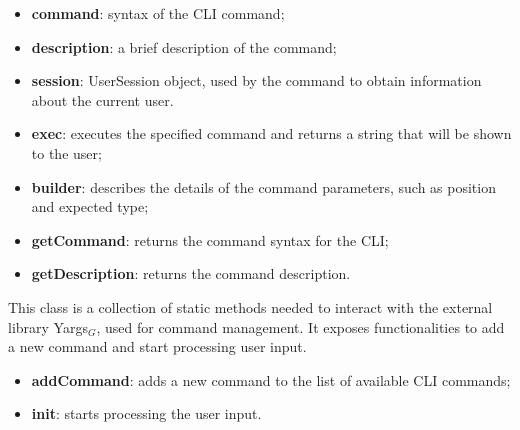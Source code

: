 					\begin{itemize}
						\item \textbf{command}: syntax of the CLI command;
						\item \textbf{description}: a brief description of the command;
						\item \textbf{session}: UserSession object, used by the command to obtain information about the current user.
					\end{itemize}

					\begin{itemize}
						\item \textbf{exec}: executes the specified command and returns a string that will be shown to the user;
						\item \textbf{builder}: describes the details of the command parameters, such as position and expected type;
						\item \textbf{getCommand}: returns the command syntax for the CLI;
						\item \textbf{getDescription}: returns the command description.
					\end{itemize}

			This class is a collection of static methods needed to interact with the external library Yargs$_{G}$, used for command management. It exposes functionalities to add a new command and start processing user input.
					\begin{itemize}
						\item \textbf{addCommand}: adds a new command to the list of available CLI commands;
						\item \textbf{init}: starts processing the user input.
					\end{itemize}

